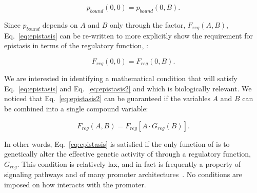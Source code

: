 \begin{equation}
  p_{bound}(0, 0) = p_{bound}(0, B).
  \label{eq:epistasis}
\end{equation}

Since \(p_{bound}\) depends on \(A\) and \(B\) only through the factor,
\(F_{reg}(A, B)\), Eq.~\ref{eq:epistasis} can be re-written to more explicitly
show the requirement for epistasis in terms of the regulatory function,
\Freg{}:

\begin{equation}
    F_{reg}(0, 0) = F_{reg}(0, B).
    \label{eq:epistasis2}
\end{equation}

We are interested in identifying a mathematical condition that will satisfy
Eq.~\ref{eq:epistasis} and Eq.~\ref{eq:epistasis2} and which is biologically
relevant. We noticed that Eq.~\ref{eq:epistasis2} can be guaranteed if the
variables \(A\) and \(B\) can be combined into a single compound variable:

\begin{equation}
    F_{reg}(A, B) = F_{reg}[A\cdot{G_{reg}(B)}].
\end{equation}

In other words, Eq.~\ref{eq:epistasis} is satisfied if the only function of
 is to genetically alter the effective genetic activity of 
through a regulatory function, \(G_{reg}\). This condition is relatively lax, and
in fact is frequently a property of signaling pathways\citep{} and of many
promoter architectures~\citep{Bintu2005a}. No conditions are imposed on how
 interacts with the promoter.

